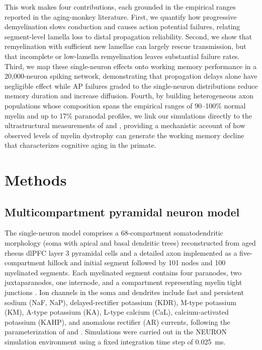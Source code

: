 \documentclass[11pt]{article}
\begin{document}
This work makes four contributions, each grounded in the empirical ranges reported in the aging-monkey literature. First, we quantify how progressive demyelination slows conduction and causes action potential failures, relating segment-level lamella loss to distal propagation reliability. Second, we show that remyelination with sufficient new lamellae can largely rescue transmission, but that incomplete or low-lamella remyelination leaves substantial failure rates. Third, we map these single-neuron effects onto working memory performance in a 20{,}000-neuron spiking network, demonstrating that propagation delays alone have negligible effect while AP failures graded to the single-neuron distributions reduce memory duration and increase diffusion. Fourth, by building heterogeneous axon populations whose composition spans the empirical ranges of 90--100\% normal myelin and up to 17\% paranodal profiles, we link our simulations directly to the ultrastructural measurements of \citet{peters2002aging} and \citet{peters2003remyelination}, providing a mechanistic account of how observed levels of myelin dystrophy can generate the working memory decline that characterizes cognitive aging in the primate.

\section{Methods}

\subsection{Multicompartment pyramidal neuron model}

The single-neuron model comprises a 68-compartment somatodendritic morphology (soma with apical and basal dendritic trees) reconstructed from aged rhesus dlPFC layer 3 pyramidal cells and a detailed axon implemented as a five-compartment hillock and initial segment followed by 101 nodes and 100 myelinated segments. Each myelinated segment contains four paranodes, two juxtaparanodes, one internode, and a compartment representing myelin tight junctions \citep{devaux2008tight,scurfield2018internodal}. Ion channels in the soma and dendrites include fast and persistent sodium (NaF, NaP), delayed-rectifier potassium (KDR), M-type potassium (KM), A-type potassium (KA), L-type calcium (CaL), calcium-activated potassium (KAHP), and anomalous rectifier (AR) currents, following the parameterization of \citet{rumbell2016automated} and \citet{coskren2015aging}. Simulations were carried out in the NEURON simulation environment \citep{carnevale2006neuron} using a fixed integration time step of 0.025~ms.
\end{document}
